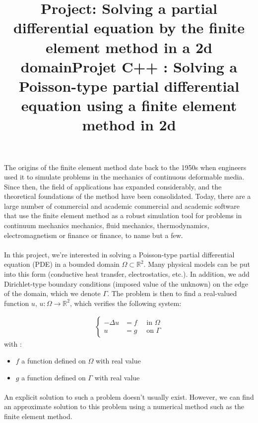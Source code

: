 \documentclass[english,10pt,a4paper]{article}
\title{Project: Solving a partial differential equation by the finite element method in a 2d domain}
\title{Projet C++ : Solving a Poisson-type partial differential equation using a finite element method in 2d}
\date{}
\begin{document}
\maketitle
The origins of the finite element method date back to the 1950s
when engineers used it to simulate problems in the mechanics
of continuous deformable media. Since then, the field of applications has expanded
considerably, and the theoretical foundations of the method have been
consolidated. Today, there are a large number of commercial and academic
commercial and academic software that use the finite element method
as a robust simulation tool for problems in continuum mechanics
mechanics, fluid mechanics, thermodynamics, electromagnetism or finance
or finance, to name but a few. %


\paragraph{}
In this project, we're interested in solving a Poisson-type partial differential equation (PDE) in a bounded domain $\Omega \subset \mathbb{R}^2$.
Many physical models can be put into this form (conductive heat transfer, electrostatics, etc.).
In addition, we add Dirichlet-type boundary conditions (imposed value of the unknown) on the edge of the domain, which we denote $\Gamma$.
The problem is then to find a real-valued function $u$, $u : \Omega \longrightarrow \mathbb{R}^2$, which verifies the following system:

\begin{eqnarray}
\left\{
  \begin{aligned}
    - \Delta u &= f \quad \text{ in } \Omega \\
    u &= g \quad \text{ on } \Gamma
  \end{aligned}
  \right.
\end{eqnarray}
with :
\begin{itemize}
  \item $f$ a function defined on $\Omega$ with real value
  \item $g$ a function defined on $\Gamma$ with real value
\end{itemize}

\paragraph{}
An explicit solution to such a problem doesn't usually exist. However, we can find an approximate solution to this problem using
a numerical method such as the finite element method.
\end{document}
